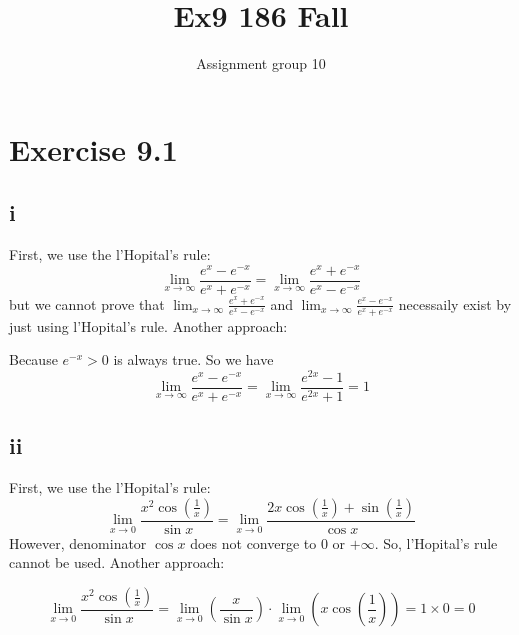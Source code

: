 \documentclass[11pt,twoside,a4paper]{article}
\begin{document}
\title{Ex9 186 Fall}
\author{Assignment group 10}
\date{}
\maketitle
\section{Exercise 9.1}
\subsection{i}
First, we use the l'Hopital's rule:
$$ \lim_{x \to \infty} \frac{e^x-e^{-x}}{e^x+e^{-x}}
=\lim_{x \to \infty} \frac{e^x+e^{-x}}{e^x-e^{-x}} $$
but we cannot prove that 
$\displaystyle \lim_{x \to \infty} \frac{e^x+e^{-x}}{e^x-e^{-x}}$
and $\displaystyle \lim_{x \to \infty} \frac{e^x-e^{-x}}{e^x+e^{-x}}$
necessaily exist by just using l'Hopital's rule.
\newline
Another approach:
\par
Because $e^{-x}>0 $ is always true. So we have 
$$\lim_{x \to \infty} \frac{e^x-e^{-x}}{e^x+e^{-x}}
=\lim_{x \to \infty} \frac{e^{2x}-1}{e^{2x}+1}=1 $$

\subsection{ii}
First, we use the l'Hopital's rule:
$$ \lim_{x \to 0} \frac{x^2\cos (\frac{1}{x})}{\sin x} 
=\lim_{x \to 0} \frac{2x\cos (\frac{1}{x})+\sin (\frac{1}{x}) }{\cos x} $$
However, denominator $\cos x$ does not converge to $0$ or $+\infty$.
So, l'Hopital's rule cannot be used.
\newline
Another approach:
\par
$$ \lim_{x \to 0} \frac{x^2\cos (\frac{1}{x})}{\sin x} 
=\lim_{x \to 0} (\frac{x}{\sin x})\cdot \lim_{x \to 0} (x\cos(\frac{1}{x}))=1\times 0=0$$
\end{document}
